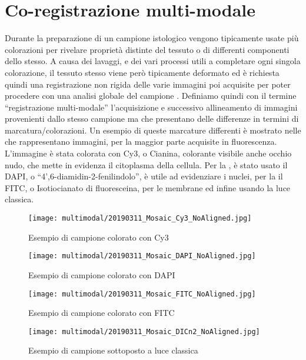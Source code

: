 \section{Co-registrazione multi-modale}
Durante la preparazione di un campione istologico vengono tipicamente usate più colorazioni per rivelare proprietà distinte del tessuto o di differenti componenti dello stesso. A causa dei lavaggi, e dei vari processi utili a completare ogni singola colorazione, il tessuto stesso viene però tipicamente deformato ed è richiesta quindi una registrazione non rigida delle varie immagini poi acquisite per poter procedere con una analisi globale del campione \cite{9058666}.\hfill \break
\noindent Definiamo quindi con il termine ``registrazione multi-modale'' l'acquisizione e successivo allineamento di immagini provenienti dallo stesso campione ma che presentano delle differenze in termini di marcatura/colorazioni. Un esempio di queste marcature differenti è mostrato nelle  che rappresentano immagini, per la maggior parte acquisite in fluorescenza. L'immagine  è stata colorata con Cy3, o Cianina, colorante visibile anche occhio nudo, che mette in evidenza il citoplasma della cellula.
Per la , è stato usato il DAPI, o ``4',6-diamidin-2-fenilindolo'', è utile ad evidenziare i nuclei, per la  il FITC, o Isotiocianato di fluoresceina, per le membrane ed infine  usando la luce classica. \par
\noindent 
\begin{figure}[H]
    \centering
    \texttt{[image: multimodal/20190311\_Mosaic\_Cy3\_NoAligned.jpg]}
    \caption{Esempio di campione colorato con Cy3}
    \label{fig:1}
\end{figure}
\begin{figure}[H]
    \centering
    \texttt{[image: multimodal/20190311\_Mosaic\_DAPI\_NoAligned.jpg]}
    \caption{Esempio di campione colorato con DAPI}
    \label{fig:2}
\end{figure}
\begin{figure}[H]
    \centering
    \texttt{[image: multimodal/20190311\_Mosaic\_FITC\_NoAligned.jpg]}
    \caption{Esempio di campione colorato con FITC}
    \label{fig:3}
\end{figure}
\begin{figure}[H]
    \centering
    \texttt{[image: multimodal/20190311\_Mosaic\_DICn2\_NoAligned.jpg]}
    \caption{Esempio di campione sottoposto a luce classica}
    \label{fig:4}
\end{figure}

